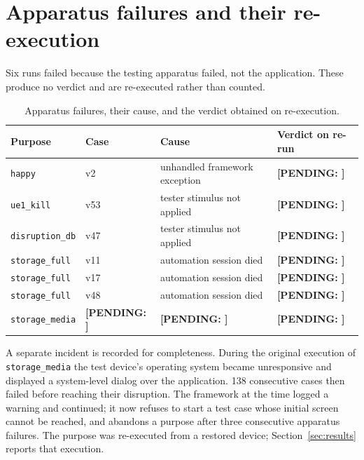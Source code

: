 \documentclass[11pt,a4paper]{article}
\newcommand{\PENDING}[1]{\textcolor{warn}{\textbf{[PENDING: #1]}}}
\newcommand{\gate}[1]{\texttt{\small #1}}
\begin{document}
\section{Apparatus failures and their re-execution}
\label{sec:toolingrerun}

Six runs failed because the testing apparatus failed, not the application. These
produce no verdict and are re-executed rather than counted.

\begin{table}[h]
\centering\footnotesize
\caption{Apparatus failures, their cause, and the verdict obtained on
re-execution.}
\begin{tabular}{@{}llll@{}}
\toprule
Purpose & Case & Cause & Verdict on re-run \\
\midrule
\gate{happy}          & v2  & unhandled framework exception & \PENDING{} \\
\gate{ue1\_kill}      & v53 & tester stimulus not applied   & \PENDING{} \\
\gate{disruption\_db} & v47 & tester stimulus not applied   & \PENDING{} \\
\gate{storage\_full}  & v11 & automation session died       & \PENDING{} \\
\gate{storage\_full}  & v17 & automation session died       & \PENDING{} \\
\gate{storage\_full}  & v48 & automation session died       & \PENDING{} \\
\gate{storage\_media} & \PENDING{} & \PENDING{} & \PENDING{} \\
\bottomrule
\end{tabular}
\end{table}

\noindent A separate incident is recorded for completeness. During the original
execution of \gate{storage\_media} the test device's operating system became
unresponsive and displayed a system-level dialog over the application. 138
consecutive cases then failed before reaching their disruption. The framework at
the time logged a warning and continued; it now refuses to start a test case
whose initial screen cannot be reached, and abandons a purpose after three
consecutive apparatus failures. The purpose was re-executed from a restored
device; Section~\ref{sec:results} reports that execution.

\end{document}
